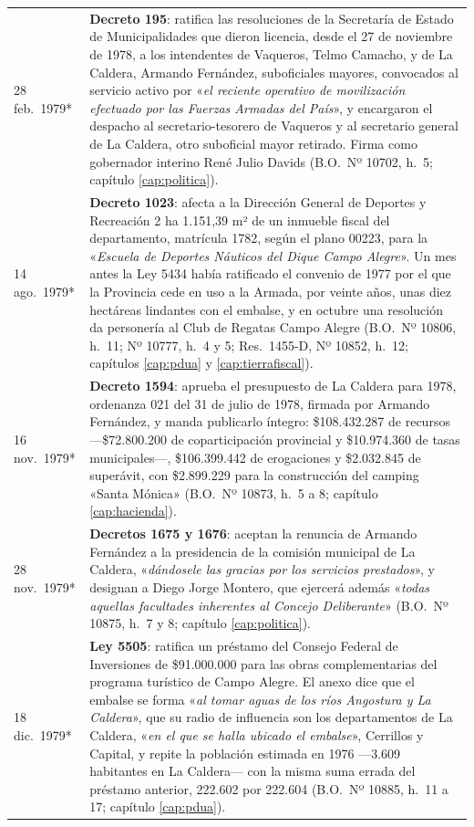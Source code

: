 \begin{longtable}{@{}p{2.7cm}p{10.3cm}@{}}
28 feb.\ 1979* & \textbf{Decreto 195}: ratifica las resoluciones de la Secretaría de Estado de Municipalidades que dieron licencia, desde el 27 de noviembre de 1978, a los intendentes de Vaqueros, Telmo Camacho, y de La Caldera, Armando Fernández, suboficiales mayores, convocados al servicio activo por «\textit{el reciente operativo de movilización efectuado por las Fuerzas Armadas del País}», y encargaron el despacho al secretario-tesorero de Vaqueros y al secretario general de La Caldera, otro suboficial mayor retirado. Firma como gobernador interino René Julio Davids (B.O.\ Nº 10702, h.\ 5; capítulo \ref{cap:politica}). \\
14 ago.\ 1979* & \textbf{Decreto 1023}: afecta a la Dirección General de Deportes y Recreación 2 ha 1.151,39 m² de un inmueble fiscal del departamento, matrícula 1782, según el plano 00223, para la «\textit{Escuela de Deportes Náuticos del Dique Campo Alegre}». Un mes antes la Ley 5434 había ratificado el convenio de 1977 por el que la Provincia cede en uso a la Armada, por veinte años, unas diez hectáreas lindantes con el embalse, y en octubre una resolución da personería al Club de Regatas Campo Alegre (B.O.\ Nº 10806, h.\ 11; Nº 10777, h.\ 4 y 5; Res.\ 1455-D, Nº 10852, h.\ 12; capítulos \ref{cap:pdua} y \ref{cap:tierrafiscal}). \\
16 nov.\ 1979* & \textbf{Decreto 1594}: aprueba el presupuesto de La Caldera para 1978, ordenanza 021 del 31 de julio de 1978, firmada por Armando Fernández, y manda publicarlo íntegro: \$108.432.287 de recursos ---\$72.800.200 de coparticipación provincial y \$10.974.360 de tasas municipales---, \$106.399.442 de erogaciones y \$2.032.845 de superávit, con \$2.899.229 para la construcción del camping «Santa Mónica» (B.O.\ Nº 10873, h.\ 5 a 8; capítulo \ref{cap:hacienda}). \\
28 nov.\ 1979* & \textbf{Decretos 1675 y 1676}: aceptan la renuncia de Armando Fernández a la presidencia de la comisión municipal de La Caldera, «\textit{dándosele las gracias por los servicios prestados}», y designan a Diego Jorge Montero, que ejercerá además «\textit{todas aquellas facultades inherentes al Concejo Deliberante}» (B.O.\ Nº 10875, h.\ 7 y 8; capítulo \ref{cap:politica}). \\
18 dic.\ 1979* & \textbf{Ley 5505}: ratifica un préstamo del Consejo Federal de Inversiones de \$91.000.000 para las obras complementarias del programa turístico de Campo Alegre. El anexo dice que el embalse se forma «\textit{al tomar aguas de los ríos Angostura y La Caldera}», que su radio de influencia son los departamentos de La Caldera, «\textit{en el que se halla ubicado el embalse}», Cerrillos y Capital, y repite la población estimada en 1976 ---3.609 habitantes en La Caldera--- con la misma suma errada del préstamo anterior, 222.602 por 222.604 (B.O.\ Nº 10885, h.\ 11 a 17; capítulo \ref{cap:pdua}). \\

\end{longtable}
